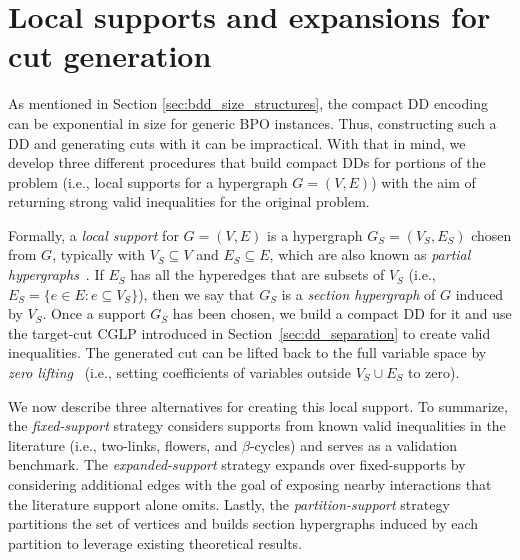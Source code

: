 \section{Local supports and expansions for cut generation}
\label{sec:support_expansion}


As mentioned in Section \ref{sec:bdd_size_structures}, the compact DD encoding can be exponential in size for generic BPO instances. Thus, constructing such a DD and generating cuts with it can be impractical. With that in mind, we develop three different procedures that build compact DDs for portions of the problem (i.e., local supports for a hypergraph $ G = (V,E)$) with the aim of returning strong valid inequalities for the original problem. 

Formally, a \emph{local support} for $G=(V,E)$ is a hypergraph $G_S=(V_S,E_S)$ chosen from $G$, typically with $V_S\subseteq V$ and $E_S\subseteq E$, which are also known as \emph{partial hypergraphs}~\cite{del2017polyhedral}. If $E_S$ has all the hyperedges that are subsets of $V_S$ (i.e., $E_S=\{e\in E : e\subseteq V_S\}$), then we say that $G_S$ is a \emph{section hypergraph} of $G$ induced by $V_S$. Once a support $G_S$ has been chosen, we build a compact DD for it and use the target-cut CGLP introduced in Section~\ref{sec:dd_separation} to create valid inequalities. The generated cut can be lifted back to the full variable
space by \emph{zero lifting}~\cite{del2017polyhedral} (i.e., setting coefficients of variables outside $V_S\cup E_S$ to zero).

We now describe three alternatives for creating this local support. To summarize, the \emph{fixed-support} strategy considers supports from known valid inequalities in the literature (i.e., two-links, flowers, and $\beta$-cycles) and serves as a validation benchmark. The \emph{expanded-support} strategy expands over fixed-supports by considering additional edges with the goal of exposing nearby interactions that the literature support alone omits. Lastly, the \emph{partition-support} strategy partitions the set of vertices and builds section hypergraphs induced by each partition to leverage existing theoretical results. 



